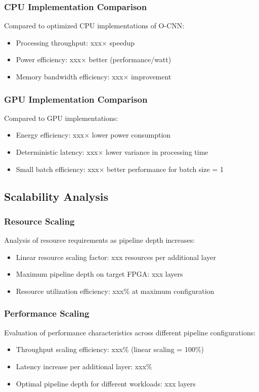\documentclass[sigconf, screen]{acmart}
\begin{document}
\subsubsection{CPU Implementation Comparison}
Compared to optimized CPU implementations of O-CNN:
\begin{itemize}
  \item Processing throughput: xxx× speedup
  \item Power efficiency: xxx× better (performance/watt)
  \item Memory bandwidth efficiency: xxx× improvement
\end{itemize}

\subsubsection{GPU Implementation Comparison}
Compared to GPU implementations:
\begin{itemize}
  \item Energy efficiency: xxx× lower power consumption
  \item Deterministic latency: xxx× lower variance in processing time
  \item Small batch efficiency: xxx× better performance for batch size = 1
\end{itemize}

\subsection{Scalability Analysis}

\subsubsection{Resource Scaling}
Analysis of resource requirements as pipeline depth increases:
\begin{itemize}
  \item Linear resource scaling factor: xxx resources per additional layer
  \item Maximum pipeline depth on target FPGA: xxx layers
  \item Resource utilization efficiency: xxx\% at maximum configuration
\end{itemize}

\subsubsection{Performance Scaling}
Evaluation of performance characteristics across different pipeline configurations:
\begin{itemize}
  \item Throughput scaling efficiency: xxx\% (linear scaling = 100\%)
  \item Latency increase per additional layer: xxx\%
  \item Optimal pipeline depth for different workloads: xxx layers
\end{itemize}
\end{document}
